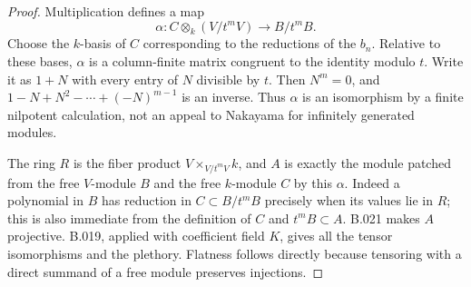 \begin{proof}
Multiplication defines a map
\[
 \alpha:C\otimes_k(V/t^mV)\longrightarrow B/t^mB.
\]
Choose the $k$-basis of $C$ corresponding to the reductions of
the $b_n$. Relative to these bases, $\alpha$ is a column-finite
matrix congruent to the identity modulo $t$. Write it as $1+N$
with every entry of $N$ divisible by $t$. Then $N^m=0$, and
$1-N+N^2-\cdots+(-N)^{m-1}$ is an inverse. Thus $\alpha$ is an
isomorphism by a finite nilpotent calculation, not an appeal to
Nakayama for infinitely generated modules.

The ring $R$ is the fiber product $V\times_{V/t^mV}k$, and $A$
is exactly the module patched from the free $V$-module $B$ and
the free $k$-module $C$ by this $\alpha$. Indeed a polynomial in
$B$ has reduction in $C\subset B/t^mB$ precisely when its values
lie in $R$; this is also immediate from the definition of $C$ and
$t^mB\subset A$. B.021 makes $A$ projective. B.019, applied with
coefficient field $K$, gives all the tensor isomorphisms and the
plethory. Flatness follows directly because tensoring with a
direct summand of a free module preserves injections.
\end{proof}

